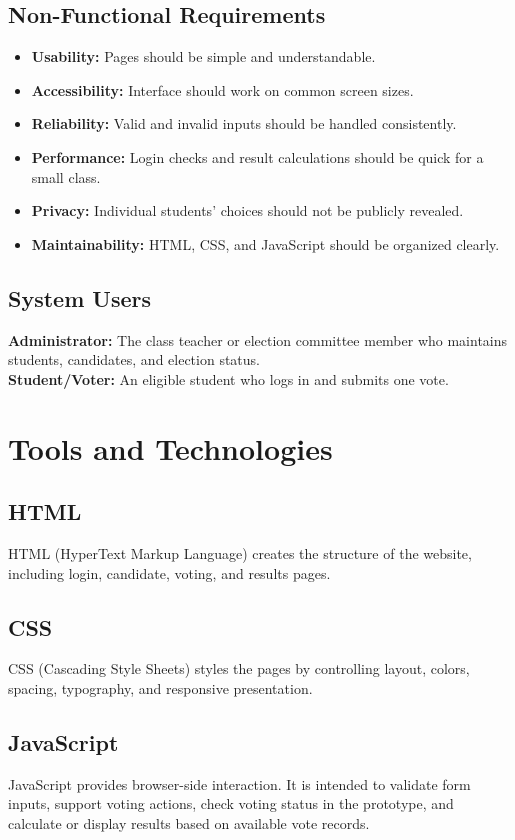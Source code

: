 \documentclass[12pt,a4paper]{report}
\begin{document}
\section{Non-Functional Requirements}
\begin{itemize}
\item \textbf{Usability:} Pages should be simple and understandable.
\item \textbf{Accessibility:} Interface should work on common screen sizes.
\item \textbf{Reliability:} Valid and invalid inputs should be handled consistently.
\item \textbf{Performance:} Login checks and result calculations should be quick for a small class.
\item \textbf{Privacy:} Individual students' choices should not be publicly revealed.
\item \textbf{Maintainability:} HTML, CSS, and JavaScript should be organized clearly.
\end{itemize}
\section{System Users}
\textbf{Administrator:} The class teacher or election committee member who maintains students, candidates, and election status.\\
\textbf{Student/Voter:} An eligible student who logs in and submits one vote.

\chapter{Tools and Technologies}
\section{HTML}
HTML (HyperText Markup Language) creates the structure of the website, including login, candidate, voting, and results pages.
\section{CSS}
CSS (Cascading Style Sheets) styles the pages by controlling layout, colors, spacing, typography, and responsive presentation.
\section{JavaScript}
JavaScript provides browser-side interaction. It is intended to validate form inputs, support voting actions, check voting status in the prototype, and calculate or display results based on available vote records.
\end{document}
